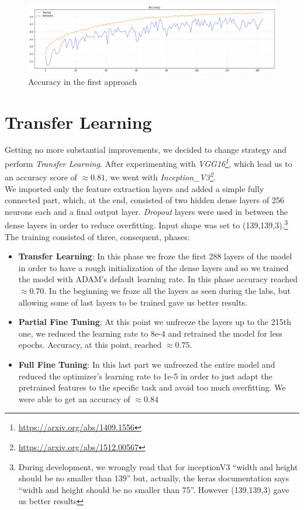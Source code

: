 \documentclass[11pt]{article}
\begin{document}
\begin{figure}[H]
	\center
	\includegraphics[width=\textwidth]{first_model_accuracy.png}
	\caption{Accuracy in the first approach}
\end{figure}



\section*{Transfer Learning}
Getting no more substantial improvements, we decided to change strategy and perform \emph{Transfer Learning}. After experimenting with \emph{VGG16\footnote{\url{https://arxiv.org/abs/1409.1556}}}, which lead us to an accuracy score of $\approx0.81$, we went with \emph{Inception\_V3\footnote{\url{https://arxiv.org/abs/1512.00567}}}.\\
We imported only the feature extraction layers and added a simple fully connected part, which, at the end, consisted of two hidden dense layers of 256 neurons each and a final output layer. \emph{Dropout} layers were used in between the dense layers in order to reduce overfitting. Input shape was set to (139,139,3).\footnote{During development, we wrongly read that for inceptionV3 ``width and height should be no smaller than 139'' but, actually, the keras documentation says ``width and height should be no smaller than 75''. However (139,139,3) gave us better results}\\
The training consisted of three, consequent, phases:
\begin{itemize}
	\item \textbf{Transfer Learning}: In this phase we froze the first 288 layers of the model in order to have a rough initialization of the dense layers and so we trained the model with ADAM's default learning rate. In this phase accuracy reached $\approx0.70$. In the beginning we froze all the layers as seen during the labs, but allowing some of last layers to be trained gave us better results.
	\item \textbf{Partial Fine Tuning}: At this point we unfreeze the layers up to the 215th one, we reduced the learning rate to 8e-4 and retrained the model for less epochs. Accuracy, at this point, reached $\approx0.75$.
	\item \textbf{Full Fine Tuning}: In this last part we unfreezed the entire model and reduced the optimizer's learning rate to 1e-5 in order to just adapt the pretrained features to the specific task and avoid too much overfitting. We were able to get an accuracy of $\approx0.84$ 
\end{itemize}
\end{document}
